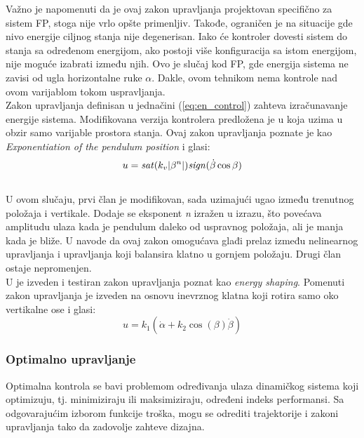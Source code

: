\documentclass[a4paper,11pt]{article}
\theoremstyle{definition} \newtheorem{deff}{Definicija}[section]
\theoremstyle{definition} \newtheorem{prim}[deff]{Primer}
\theoremstyle{plain} \newtheorem{teor}[deff]{Teorema}
\begin{document}
	Važno je napomenuti da je ovaj zakon upravljanja projektovan specifično za sistem FP, stoga nije vrlo opšte primenljiv. Takođe, ograničen je na situacije gde nivo energije ciljnog stanja nije degenerisan. Iako će kontroler dovesti sistem do stanja sa određenom energijom, ako postoji više konfiguracija sa istom energijom, nije moguće izabrati između njih. Ovo je slučaj kod FP, gde energija sistema ne zavisi od ugla horizontalne ruke $\alpha$. Dakle, ovom tehnikom nema kontrole nad ovom varijablom tokom uspravljanja. \\
	
	Zakon upravljanja definisan u jednačini (\ref{eq:en_control}) zahteva izračunavanje energije sistema. Modifikovana verzija kontrolera predložena je u \cite{energy_c} koja uzima u obzir samo varijable prostora stanja. Ovaj zakon upravljanja poznate je kao 
	\textit{Exponentiation of the pendulum position} i glasi:\\
	
	\begin{equation}
		u = \text{\textit{sat}}(k_v |\beta^n|) \text{\textit{sign}}( \dot{\beta} \cos \beta)
	\end{equation} \\
	
	U ovom slučaju, prvi član je modifikovan, sada uzimajući ugao između trenutnog položaja i vertikale.
	Dodaje se eksponent \textit{n} izražen u izrazu, što povećava amplitudu ulaza kada je pendulum daleko od uspravnog položaja, ali je manja kada je bliže. U \cite{inicijalna} navode da ovaj zakon omogućava glađi prelaz između nelinearnog upravljanja i upravljanja koji balansira klatno u gornjem položaju. Drugi član ostaje nepromenjen. \\
	
	U \cite{ener_shaping} je izveden i testiran zakon upravljanja poznat kao \textit{energy shaping}. Pomenuti zakon upravljanja je izveden na osnovu inevrznog klatna koji rotira samo oko vertikalne ose i glasi: \\
	
	\begin{equation}
		u = k_1 (\dot\alpha + k_2 \cos(\beta) \dot\beta)	
	\end{equation}
	
	\subsubsection{Optimalno upravljanje}
	Optimalna kontrola se bavi problemom određivanja ulaza dinamičkog sistema koji optimizuju, tj. minimiziraju ili maksimiziraju, određeni indeks performansi. Sa odgovarajućim izborom funkcije troška, mogu se odrediti trajektorije i zakoni upravljanja tako da zadovolje zahteve dizajna.\\
	
\end{document}
